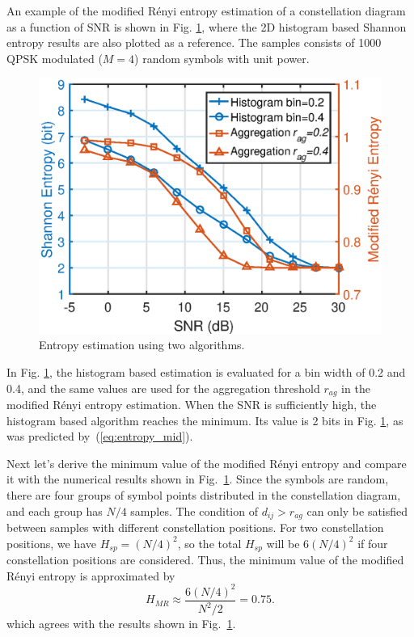 \documentclass[journal,comsoc, onecolumn, 12pt,draftclsnofoot]{IEEEtran} %
\begin{document}
An example of the modified R\'enyi entropy estimation of a constellation diagram as a function of SNR is shown in Fig. \ref{fig:MRE}, where the 2D histogram based Shannon entropy results are also plotted as a reference.
The samples consists of 1000 QPSK modulated (\(M=4\)) random symbols with unit power.

\begin{figure}[ht]
\centering
\includegraphics[width=3 in]{pic/H_MR.eps}
\caption{Entropy estimation using two algorithms.}
\label{fig:MRE} 
\end{figure}

In Fig. \ref{fig:MRE}, the histogram based estimation is evaluated for a bin width of 0.2 and 0.4, and the same values are used for the aggregation threshold \(r_{ag}\) in the modified R\'enyi entropy estimation.
When the SNR is sufficiently high, the histogram based algorithm reaches the minimum. 
Its value is 2 bits in Fig. \ref{fig:MRE}, as was predicted by~(\ref{eq:entropy_mid}).

Next let's derive the minimum value of the modified R\'enyi entropy and compare it with the numerical results shown in Fig.~\ref{fig:MRE}.
Since the symbols are random, there are four groups of symbol points distributed in the constellation diagram, and each group has \(N/4\) samples.
The condition of $d_{ij}>r_{ag}$ can only be satisfied between samples with different constellation positions.
For two constellation positions, we have $H_{sp} = (N/4)^2$, so the total $H_{sp}$ will be $6 (N/4)^2$ if four constellation positions are considered.
Thus, the minimum value of the modified R\'enyi entropy is approximated by
\begin{equation}
H_{MR} \approx \frac{ 6 \left(N/4\right)^2}{N^2/2}=0.75.
\label{eq:adEntQPSK}
\end{equation}
which agrees with the results shown in Fig.~\ref{fig:MRE}.
\end{document}
